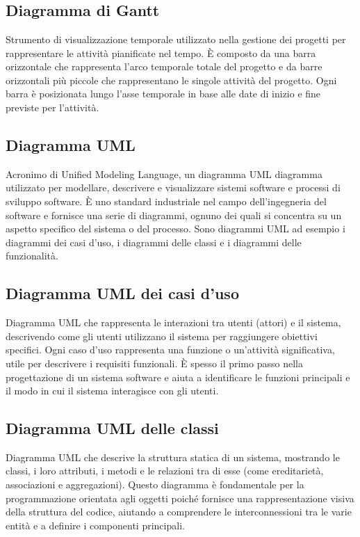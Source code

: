 
\section{}

\subsection*{Diagramma di Gantt}
Strumento di visualizzazione temporale utilizzato nella gestione dei progetti per rappresentare le attività pianificate nel tempo. È composto da una barra 
orizzontale che rappresenta l’arco temporale totale del progetto e da barre orizzontali più piccole che rappresentano le singole attività del progetto. 
Ogni barra è posizionata lungo l’asse temporale in base alle date di inizio e fine previste per l’attività.

\subsection*{Diagramma UML}
Acronimo di Unified Modeling Language, un diagramma UML diagramma utilizzato per modellare, descrivere e visualizzare sistemi software e processi di sviluppo 
software. È uno standard industriale nel campo dell’ingegneria del software e fornisce una serie di diagrammi, ognuno dei quali si concentra su un aspetto 
specifico del sistema o del processo. Sono diagrammi UML ad esempio i diagrammi dei casi d’uso, i diagrammi delle classi e i diagrammi delle funzionalità.

\subsection*{Diagramma UML dei casi d'uso}
Diagramma UML che rappresenta le interazioni tra utenti (attori) e il sistema, descrivendo come gli utenti utilizzano il sistema per raggiungere obiettivi 
specifici. Ogni caso d'uso rappresenta una funzione o un'attività significativa, utile per descrivere i requisiti funzionali. È spesso il primo passo nella 
progettazione di un sistema software e aiuta a identificare le funzioni principali e il modo in cui il sistema interagisce con gli utenti.

\subsection*{Diagramma UML delle classi}
Diagramma UML che descrive la struttura statica di un sistema, mostrando le classi, i loro attributi, i metodi e le relazioni tra di esse (come ereditarietà, 
associazioni e aggregazioni). Questo diagramma è fondamentale per la programmazione orientata agli oggetti poiché fornisce una rappresentazione visiva della 
struttura del codice, aiutando a comprendere le interconnessioni tra le varie entità e a definire i componenti principali.

